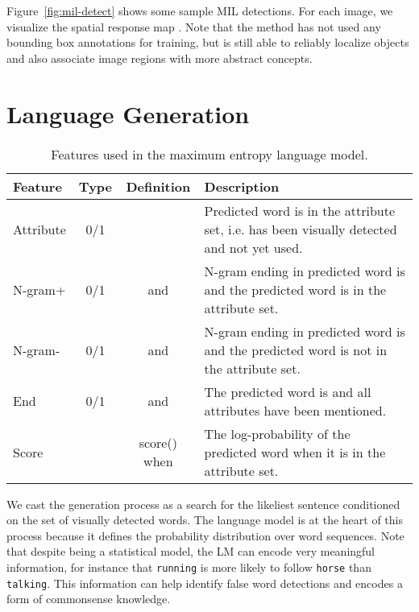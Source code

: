 \documentclass[10pt,twocolumn,letterpaper]{article}
\begin{document}
Figure~\ref{fig:mil-detect} shows some sample MIL detections. For each image, we visualize the spatial response map . Note that the method has not used any bounding box annotations for training, but is still able to reliably localize objects and also associate image regions with more abstract concepts.

\section{Language Generation}\label{sec:language}

\begin{table*}\centering\footnotesize
\caption{Features used in the maximum entropy language model.}
\label{tab:features}\vspace{1mm}
\begin{tabular}{@{}l@{\hspace{4mm}}c@{\hspace{4mm}}c@{\hspace{4mm}}l}
\toprule
 Feature & Type & Definition & Description\\
\midrule
 Attribute & 0/1 &  &
 Predicted word is in the attribute set, i.e. has been visually detected and not yet used. \\
 N-gram+& 0/1 &  and  &
 N-gram ending in predicted word is  and the predicted word is in the attribute set. \\
 N-gram-& 0/1 &  and  &
 N-gram ending in predicted word is  and the predicted word is not in the attribute set. \\
 End & 0/1 &  and  &
 The predicted word is  and all attributes have been mentioned. \\
 Score &  & score() when  &
 The log-probability of the predicted word when it is in the attribute set. \\
\bottomrule
\end{tabular}
\vspace{-1em}
\end{table*}

We cast the generation process as a search for the likeliest sentence conditioned on the set of visually detected words. The language model is at the heart of this process because it defines the probability distribution over word sequences. Note that despite being a statistical model, the LM can encode very meaningful information, for instance that \texttt{running} is more likely to follow \texttt{horse} than \texttt{talking}. This information can help identify false word detections and encodes a form of commonsense knowledge.
\end{document}

